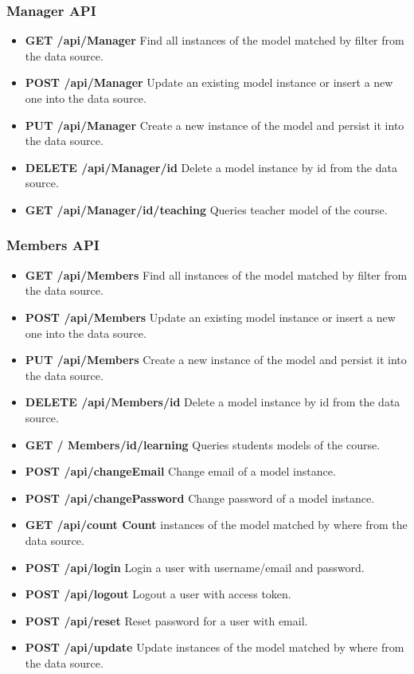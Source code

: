 \subsubsection{ Manager API}
\begin{itemize}
  \item \textbf{GET /api/Manager} Find all instances of the model matched by filter from the data source.
  \item \textbf{POST /api/Manager} Update an existing model instance or insert a new one into the data  source.
  \item \textbf{PUT /api/Manager} Create a new instance of the model and persist it into the data source.
  \item \textbf{DELETE /api/Manager/id} Delete a model instance by id from the data source.
\item \textbf{GET /api/Manager/id/teaching} {\color{red}Queries teacher model of the course.}

\end{itemize}


\subsubsection{ Members API}
\begin{itemize}
\item \textbf{GET /api/Members} Find all instances of the model matched by filter from  the  data source.
\item \textbf{POST /api/Members} Update an existing model instance or insert a new one into the data  source.
\item \textbf{PUT /api/Members} Create a new instance of the model and persist it into the data source.
\item \textbf{DELETE /api/Members/id} Delete a model instance by id from the data source.
\item \textbf{GET / Members/id/learning} {\color{red} Queries students models of the course.}

\item \textbf{POST /api/changeEmail} Change email of a model instance.
\item \textbf{POST /api/changePassword} Change password of a model instance.
\item \textbf{GET /api/count Count} instances of the model matched by where from the  data source.
\item \textbf{POST /api/login} Login a user with username/email and password.
\item \textbf{POST /api/logout} Logout a user with access   token.
\item \textbf{POST /api/reset} Reset password for a user with email.
\item \textbf{POST /api/update} Update instances of the model matched by where from the data source.
\end{itemize}

